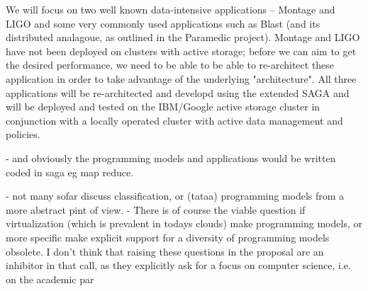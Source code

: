 \documentclass[10pt,letterpaper]{article}
\begin{document}
We will focus on two well known data-intensive applications -- Montage and LIGO  
and some very commonly used applications such as Blast (and its distributed
analagoue, as outlined in the Paramedic project). Montage and LIGO have not
been deployed on clusters with active storage; before we can aim to get the
desired performance, we need to be able to be able to re-architect these
application in order to take advantage of the underlying "architecture". All three
applications will be re-architected and developd using the extended SAGA and will be
deployed and tested on the IBM/Google active storage cluster in conjunction with 
a locally operated cluster with active data management and policies.


 




- and obviously the programming models and applications would be written coded
in saga eg map reduce.


 - not many sofar discuss classification, or (tataa) programming models
 from a more abstract pint of view.
- There is of course the viable question if virtualization
(which is prevalent in todays clouds) make programming models, or more specific make explicit support for a
diversity of programming models obsolete.  
I don't think that raising these questions in the proposal are an inhibitor in that call, as they explicitly ask for a
focus on computer science, i.e. on the academic par
\end{document}

